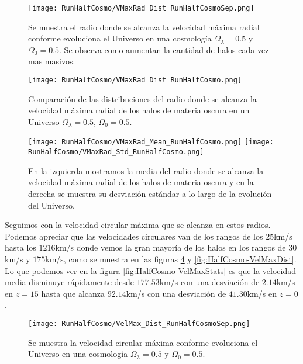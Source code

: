 \begin{figure}[H]
    \centering
    \texttt{[image: RunHalfCosmo/VMaxRad\_Dist\_RunHalfCosmoSep.png]}
    \caption[Radio donde se alcanza la velocidad máxima radial]{\footnotesize Se muestra el radio donde se alcanza la velocidad máxima radial conforme evoluciona el Universo en una cosmología $\Omega_\lambda = 0.5$ y $\Omega_0 = 0.5$. Se observa como aumentan la cantidad de halos cada vez mas masivos.}
    \label{fig:HalfCosmo-VMaxRadDistSep}
\end{figure}

\begin{figure}[H]
    \centering
    \texttt{[image: RunHalfCosmo/VMaxRad\_Dist\_RunHalfCosmo.png]}
    \caption[Distribución del radio donde se alcanza la velocidad máxima radial]{\footnotesize Comparación de las distribuciones del radio donde se alcanza la velocidad máxima radial de los halos de materia oscura en un Universo $\Omega_\lambda = 0.5$, $\Omega_0 = 0.5$.}
    \label{fig:HalfCosmo-VMaxRadDist}
\end{figure}

\begin{figure}[H]
    \centering
    \texttt{[image: RunHalfCosmo/VMaxRad\_Mean\_RunHalfCosmo.png]}
    \texttt{[image: RunHalfCosmo/VMaxRad\_Std\_RunHalfCosmo.png]}
    \caption[Media y desviación estándar del Radio donde se alcanza la velocidad máxima radial]{\footnotesize En la izquierda mostramos la media del radio donde se alcanza la velocidad máxima radial de los halos de materia oscura y en la derecha se muestra su desviación estándar a lo largo de la evolución del Universo.}
    \label{fig:HalfCosmo-VMaxRadStats}
\end{figure}

Seguimos con la velocidad circular máxima que se alcanza en estos radios. Podemos apreciar que las velocidades circulares van de los rangos de los $25$km/s hasta los $1216$km/s donde vemos la gran mayoría de los halos en los rangos de $30$km/s y $175$km/s, como se muestra en las figuras \ref{fig:HalfCosmo-VelMaxDistSep} y \ref{fig:HalfCosmo-VelMaxDist}. Lo que podemos ver en la figura \ref{fig:HalfCosmo-VelMaxStats} es que la velocidad  media disminuye rápidamente desde $177.53$km/s con una desviación de $2.14$km/s en $z=15$ hasta que alcanza $92.14$km/s con una desviación de $41.30$km/s en $z=0$. 

\begin{figure}[H]
    \centering
    \texttt{[image: RunHalfCosmo/VelMax\_Dist\_RunHalfCosmoSep.png]}
    \caption[Velocidad circular máxima]{\footnotesize Se muestra la velocidad circular máxima conforme evoluciona el Universo en una cosmología $\Omega_\lambda = 0.5 $ y $\Omega_0 = 0.5$.}
    \label{fig:HalfCosmo-VelMaxDistSep}
\end{figure}

